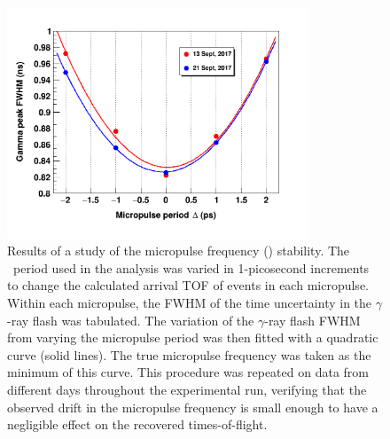 \begin{figure}[tb]
    \centering
    \includegraphics[width=0.8\textwidth]{figures/RFTimeStudy.png}
    \caption[Stability of the beam pick-off (\tZero) frequency during the experiment]
    {Results of a study of the micropulse frequency (\tZero) stability. The \tZero\ period used
        in the analysis was varied in 1-picosecond increments to change the
        calculated arrival TOF of events in each micropulse.
        Within each micropulse, the FWHM of
        the time uncertainty in the $\gamma$-ray flash was tabulated. The
        variation of the $\gamma$-ray flash FWHM from varying the micropulse period was
        then fitted with a quadratic curve (solid lines). The true micropulse
        frequency was taken as the minimum of this curve. This procedure was
        repeated on data from different days throughout the experimental run,
        verifying that the observed drift in the micropulse frequency is small enough to have a 
        negligible effect on the recovered times-of-flight.
    }
    \label{RFTimeStudy}
\end{figure}

